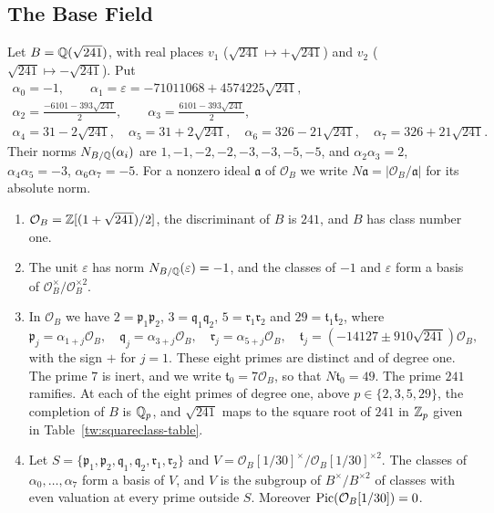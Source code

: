 \subsection{The Base Field}\label{tw:base-section}
Let $B=\mathbb Q(\sqrt{241})$, with real places $v_1$ ($\sqrt{241}\mapsto+\sqrt{241}$)
and $v_2$ ($\sqrt{241}\mapsto-\sqrt{241}$). Put
\begin{equation}\label{tw:alpha}
\begin{gathered}
 \alpha_0=-1,\qquad \alpha_1=\varepsilon=-71011068+4574225\sqrt{241},\\
 \alpha_2=\tfrac{-6101-393\sqrt{241}}2,\qquad
 \alpha_3=\tfrac{6101-393\sqrt{241}}2,\\
 \alpha_4=31-2\sqrt{241},\quad \alpha_5=31+2\sqrt{241},\quad
 \alpha_6=326-21\sqrt{241},\quad \alpha_7=326+21\sqrt{241}.
\end{gathered}
\end{equation}
Their norms $N_{B/\mathbb Q}(\alpha_i)$ are $1,-1,-2,-2,-3,-3,-5,-5$, and
$\alpha_2\alpha_3=2$, $\alpha_4\alpha_5=-3$, $\alpha_6\alpha_7=-5$. For a
nonzero ideal $\mathfrak a$ of $\mathcal O_B$ we write
$N\mathfrak a=|\mathcal O_B/\mathfrak a|$ for its absolute norm.

\begin{lemma}\label{tw:base}
\begin{enumerate}
\item[(a)] $\mathcal O_B=\mathbb Z[(1+\sqrt{241})/2]$, the discriminant of $B$ is
 $241$, and $B$ has class number one.
\item[(b)] The unit $\varepsilon$ has norm $N_{B/\mathbb Q}(\varepsilon)=-1$, and the
 classes of $-1$ and $\varepsilon$ form a basis of
 $\mathcal O_B^\times/\mathcal O_B^{\times2}$.
\item[(c)] In $\mathcal O_B$ we have $2=\mathfrak p_1\mathfrak p_2$,
 $3=\mathfrak q_1\mathfrak q_2$, $5=\mathfrak r_1\mathfrak r_2$ and
 $29=\mathfrak t_1\mathfrak t_2$, where
 \[
  \mathfrak p_j=\alpha_{1+j}\mathcal O_B,\quad
  \mathfrak q_j=\alpha_{3+j}\mathcal O_B,\quad
  \mathfrak r_j=\alpha_{5+j}\mathcal O_B,\quad
  \mathfrak t_j=(-14127\pm910\sqrt{241})\mathcal O_B,
 \]
 with the sign $+$ for $j=1$. These eight primes are distinct and of degree
 one. The prime $7$ is inert, and we write $\mathfrak t_0=7\mathcal O_B$, so
 that $N\mathfrak t_0=49$. The prime $241$ ramifies. At each of the eight
 primes of degree one, above $p\in\{2,3,5,29\}$, the completion of $B$ is
 $\mathbb Q_p$, and $\sqrt{241}$ maps to the square root of $241$ in $\mathbb Z_p$ given in
 Table~\ref{tw:squareclass-table}.
\item[(d)] Let $S=\{\mathfrak p_1,\mathfrak p_2,\mathfrak q_1,\mathfrak q_2,\mathfrak r_1,\mathfrak r_2\}$
 and $V=\mathcal O_B[1/30]^\times/\mathcal O_B[1/30]^{\times2}$. The classes
 of $\alpha_0,\dots,\alpha_7$ form a basis of $V$, and $V$ is the subgroup of
 $B^\times/B^{\times2}$ of classes with even valuation at every prime outside
 $S$. Moreover $\operatorname{Pic}(\mathcal O_B[1/30])=0$.
\end{enumerate}
\end{lemma}

